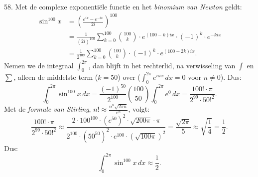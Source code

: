 \begin{problem}{58.}
	Met de complexe exponentiële functie en het \textit{binomium van Newton} geldt:
    \begin{equation*}
    \begin{split}
        \sin^{100} x & = {\left( \frac{e^{i x} - e^{- i x}}{2i} \right)}^{100} \\
                     & = \frac{1}{{(2i)}^{100}} \textstyle\sum\limits_{k=0}^{100} \binom{100}{k} \cdot e^{(100 - k) i x} \cdot {(-1)}^k \cdot e^{- k i x} \\
                     & = \frac{1}{2^{100}} \textstyle\sum\limits_{k=0}^{100} \binom{100}{k} \cdot {(-1)}^k \cdot e^{(100 - 2k) i x}.
    \end{split}
    \end{equation*}
    Nemen we de integraal $\int_{0}^{2 \pi}$, dan blijft in het rechterlid, na verwisseling van $\int$ en $\sum$, alleen de middelste term ($k = 50$) over ($\int_{0}^{2 \pi} e^{n i x}\,dx = 0$ voor $n \neq 0$). Dus:
    \begin{equation*}
        \int_{0}^{2 \pi} \sin^{100} x\,dx = \frac{{(-1)}^{50}}{2^{100}} \binom{100}{50} \int_{0}^{2 \pi} e^0\,dx = \frac{100! \cdot \pi}{2^{99} \cdot {50!}^2}.
    \end{equation*}
    Met de \textit{formule van Stirling}, $n! \approx \frac{n^n \sqrt{2 \pi n}}{e^n}$, volgt:
    \begin{equation*}
        \frac{100! \cdot \pi}{2^{99} \cdot {50!}^2} \approx \frac{2 \cdot {100}^{100} \cdot {\left( e^{50} \right)}^2 \cdot \sqrt{200 \pi} \cdot \pi}{2^{100} \cdot {\left( {50}^{50} \right)}^2 \cdot e^{100} \cdot {\left( \sqrt{100 \pi} \right)}^2} = \frac{\sqrt{2 \pi}}{5} \approx \sqrt{\frac{1}{4}} = \frac{1}{2}.
    \end{equation*}
    Dus:
    \begin{equation*}
        \int_{0}^{2 \pi} \sin^{100} x\,dx \approx \frac{1}{2}.
    \end{equation*}
\end{problem}

\clearpage

